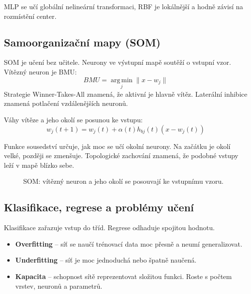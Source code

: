 MLP se učí globální nelineární transformaci, RBF je lokálnější a hodně závisí
na rozmístění center.

\subsection*{Samoorganizační mapy (SOM)}
SOM je učení bez učitele. Neurony ve výstupní mapě soutěží o vstupní vzor.
Vítězný neuron je BMU:
\begin{equation}
    BMU=\operatorname*{arg\,min}_{j}\|x-w_j\|
\end{equation}
Strategie Winner-Takes-All znamená, že aktivní je hlavně vítěz. Laterální
inhibice znamená potlačení vzdálenějších neuronů.

Váhy vítěze a jeho okolí se posunou ke vstupu:
\begin{equation}
    w_j(t+1)=w_j(t)+\alpha(t)h_{bj}(t)(x-w_j(t))
\end{equation}

Funkce sousedství určuje, jak moc se učí okolní neurony. Na začátku je okolí
velké, později se zmenšuje. Topologické zachování znamená, že podobné vstupy
leží v mapě blízko sebe.

\begin{figure}[H]
    \centering
    \caption{SOM: vítězný neuron a jeho okolí se posouvají ke vstupnímu vzoru.}
\end{figure}

\subsection*{Klasifikace, regrese a problémy učení}
Klasifikace zařazuje vstup do tříd. Regrese odhaduje spojitou hodnotu.

\begin{itemize}
    \item \textbf{Overfitting} -- síť se naučí trénovací data moc přesně a neumí generalizovat.
    \item \textbf{Underfitting} -- síť je moc jednoduchá nebo špatně naučená.
    \item \textbf{Kapacita} -- schopnost sítě reprezentovat složitou funkci. Roste s počtem vrstev, neuronů a parametrů.
\end{itemize}

